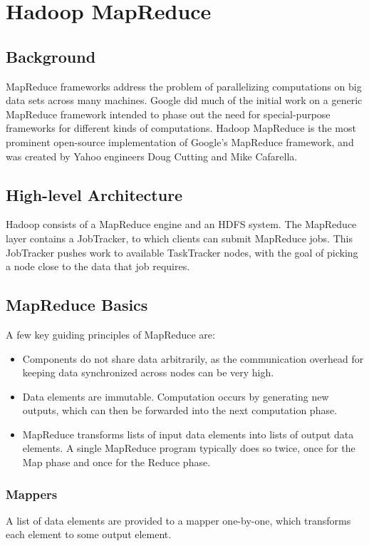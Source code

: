 \documentclass[12pt,titlepage]{article}
\begin{document}
  \section{Hadoop MapReduce}

    \subsection{Background}
      MapReduce frameworks address the problem of parallelizing computations on big data sets across many machines. Google did much of the initial work on a generic
      MapReduce framework intended to phase out the need for special-purpose frameworks for different kinds of computations. Hadoop MapReduce is the most prominent
      open-source implementation of Google's MapReduce framework, and was created by Yahoo engineers Doug Cutting and Mike Cafarella.

    \subsection{High-level Architecture}
      Hadoop consists of a MapReduce engine and an HDFS system. The MapReduce layer contains a JobTracker, to which clients can submit MapReduce jobs. This JobTracker
      pushes work to available TaskTracker nodes, with the goal of picking a node close to the data that job requires.

    \subsection{MapReduce Basics}
      A few key guiding principles of MapReduce are:
      \begin{itemize}
        \item Components do not share data arbitrarily, as the communication overhead for keeping data synchronized across nodes can be very high.
        \item Data elements are immutable. Computation occurs by generating new outputs, which can then be forwarded into the next computation phase.
        \item MapReduce transforms lists of input data elements into lists of output data elements. A single MapReduce program typically does so twice, once for the
        Map phase and once for the Reduce phase.
      \end{itemize}

      \subsubsection{Mappers}
        A list of data elements are provided to a mapper one-by-one, which transforms each element to some output element.
\end{document}
